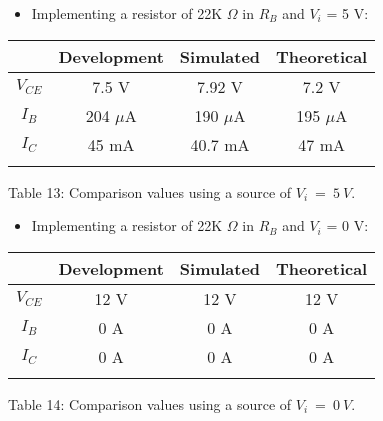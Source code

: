 {\bfseries
\begin{itemize}
\item Implementing a resistor of 22K $\Omega$ in $R_{B}$ and $V_{i}$ = 5 V:
\end{itemize}} \hfill 

\begin{center}
\begin{tabular}[1.5cm]{c c c c}
\toprule
\toprule
\centering \hspace{75pt} & \hspace{30pt} Development \hspace{30pt} & \hspace{30pt} Simulated \hspace{30pt} & \hspace{30pt} Theoretical \hspace{30pt} \\
\midrule
\midrule
$V_{CE}$ & 7.5 V & 7.92 V & 7.2 V \\
\cmidrule{1-4}
$I_{B}$ & 204 $\mu$A & 190 $\mu$A & 195 $\mu$A \\
\cmidrule{1-4}
$I_{C}$ & 45 mA & 40.7 mA & 47 mA \\
\bottomrule
\linebreak
\end{tabular}
\linebreak Table 13: Comparison values using a source of $V_{i}\ =\ 5\ V$.
\end{center} \hfill

{\bfseries
\begin{itemize}
\item Implementing a resistor of 22K $\Omega$ in $R_{B}$ and $V_{i}$ = 0 V:
\end{itemize}} \hfill 

\begin{center}
\begin{tabular}[1.5cm]{c c c c}
\toprule
\toprule
\centering \hspace{75pt} & \hspace{30pt} Development \hspace{30pt} & \hspace{30pt} Simulated \hspace{30pt} & \hspace{30pt} Theoretical \hspace{30pt} \\
\midrule
\midrule
$V_{CE}$ & 12 V & 12 V & 12 V \\
\cmidrule{1-4}
$I_{B}$ &  0 A & 0 A & 0 A \\
\cmidrule{1-4}
$I_{C}$ & 0 A & 0 A & 0 A \\
\bottomrule
\linebreak
\end{tabular}
\linebreak Table 14: Comparison values using a source of $V_{i}\ =\ 0\ V$.
\end{center} \hfill

\pagebreak